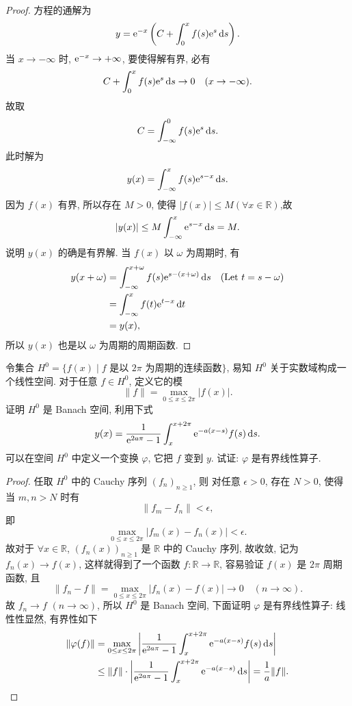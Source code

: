\begin{proof}
  方程的通解为
  \[y=\mathrm{e}^{-x}\left(C+\int_0^xf(s)\mathrm{e}^s\mathop{}\!\mathrm{d} s\right).\]
  当 $x\to-\infty$ 时, $\mathrm{e}^{-x}\to+\infty$, 要使得解有界, 必有
  \[C+\int_0^xf(s)\mathrm{e}^s\mathop{}\!\mathrm{d} s\to 0\quad (x\to-\infty).\]
  故取
  \[C = \int_{-\infty}^0f(s)\mathrm{e}^s\mathop{}\!\mathrm{d} s.\]
  此时解为
  \[y(x)=\int_{-\infty}^xf(s)\mathrm{e}^{s-x}\mathop{}\!\mathrm{d} s.\]
  因为 $f(x)$ 有界, 所以存在 $M>0$, 使得 $|f(x)|\leq M(\forall x\in\mathbb{R})$,故
  \[|y(x)|\leq M\int_{-\infty}^x\mathrm{e}^{s-x}\mathop{}\!\mathrm{d} s = M.\]
  说明 $y(x)$ 的确是有界解. 当 $f(x)$ 以 $\omega$ 为周期时, 有
  \begin{align*}
    y(x+\omega)
    & = \int_{-\infty}^{x+\omega}f(s)\mathrm{e}^{s-(x+\omega)}\mathop{}\!\mathrm{d} s\quad(\text{Let }t=s-\omega) \\
    & = \int_{-\infty}^xf(t)\mathrm{e}^{t-x}\mathop{}\!\mathrm{d} t \\
    & = y(x),
  \end{align*}
  所以 $y(x)$ 也是以 $\omega$ 为周期的周期函数.
\end{proof}



\begin{exercise}
  令集合 $H^0=\{f(x)\mid f\text{\ 是以\ }2\pi\text{\ 为周期的连续函数}\}$,
  易知 $H^0$ 关于实数域构成一个线性空间. 对于任意 $f\in H^0$, 定义它的模
  \[\|f\| = \max_{0\leq x\leq 2\pi}|f(x)|.\]
  证明 $H^0$ 是 Banach 空间, 利用下式
  \[y(x)=\frac{1}{\mathrm{e}^{2a\pi}-1}\int_x^{x+2\pi}\mathrm{e}^{-a(x-s)}f(s)\mathop{}\!\mathrm{d} s.\]
  可以在空间 $H^0$ 中定义一个变换 $\varphi$, 它把 $f$ 变到 $y$. 试证: $\varphi$ 是有界线性算子.
\end{exercise}

\begin{proof}
  任取 $H^0$ 中的 Cauchy 序列 $(f_n)_{n\geq 1}$, 则
  对任意 $\epsilon>0$, 存在 $N>0$, 使得当 $m,n>N$ 时有
  \[\|f_m-f_n\|<\epsilon,\]
  即
  \[\max_{0\leq x\leq 2\pi}|f_m(x)-f_n(x)|<\epsilon.\]
  故对于 $\forall x\in\mathbb{R}$, $\left(f_n(x)\right)_{n\geq 1}$ 是 $\mathbb{R}$ 中的 Cauchy 序列,
  故收敛, 记为$f_n(x)\to f(x)$, 这样就得到了一个函数 $f:\mathbb{R}\to\mathbb{R}$,
  容易验证 $f(x)$ 是 $2\pi$ 周期函数, 且
  \[\|f_n-f\|=\max_{0\leq x\leq2\pi}|f_n(x)-f(x)|\to 0\quad (n\to\infty).\]
  故 $f_n\to f$ $(n\to\infty)$, 所以 $H^0$ 是 Banach 空间, 下面证明 $\varphi$ 是有界线性算子:
  线性性显然, 有界性如下
  \begin{align*}
    \|\varphi(f)\|
    & = \max_{0\leq x\leq2\pi}\left|\frac{1}{\mathrm{e}^{2a\pi}-1}
      \int_x^{x+2\pi}\mathrm{e}^{-a(x-s)}f(s)\mathop{}\!\mathrm{d} s\right| \\
    & \leq \|f\|\cdot\left|\frac{1}{\mathrm{e}^{2a\pi}-1}
      \int_x^{x+2\pi}\mathrm{e}^{-a(x-s)}\mathop{}\!\mathrm{d} s\right| = \frac{1}{a}\|f\|.
    \qedhere
  \end{align*}
\end{proof}



